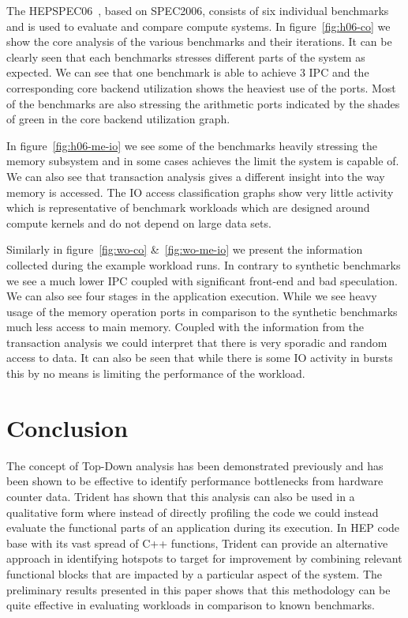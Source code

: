 \documentclass{webofc}
\begin{document}
The HEPSPEC06~\cite{michelotto2010comparison}, based on SPEC2006, consists of six individual benchmarks and is used to evaluate and compare compute systems. In figure~\ref{fig:h06-co} we show the core analysis of the various benchmarks and their iterations. It can be clearly seen that each benchmarks stresses different parts of the system as expected. We can see that one benchmark is able to achieve 3 IPC and the corresponding core backend utilization shows the heaviest use of the ports. Most of the benchmarks are also stressing the arithmetic ports indicated by the shades of green in the core backend utilization graph.

In figure~\ref{fig:h06-me-io} we see some of the benchmarks heavily stressing the memory subsystem and in some cases achieves the limit the system is capable of. We can also see that transaction analysis gives a different insight into the way memory is accessed. The IO access classification graphs show very little activity which is representative of benchmark workloads which are designed around compute kernels and do not depend on large data sets.

Similarly in figure~\ref{fig:wo-co} \&~\ref{fig:wo-me-io} we present the information collected during the example workload runs. In contrary to synthetic benchmarks we see a much lower IPC coupled with significant front-end and bad speculation. We can also see four stages in the application execution. While we see heavy usage of the memory operation ports in comparison to the synthetic benchmarks much less access to main memory. Coupled with the information from the transaction analysis we could interpret that there is very sporadic and random access to data. It can also be seen that while there is some IO activity in bursts this by no means is limiting the performance of the workload.


\section{Conclusion}

The concept of Top-Down analysis has been demonstrated previously and has been shown to be effective to identify performance bottlenecks from hardware counter data. Trident has shown that this analysis can also be used in a qualitative form where instead of directly profiling the code we could instead evaluate the functional parts of an application during its execution. In HEP code base with its vast spread of C++ functions, Trident can provide an alternative approach in identifying hotspots to target for improvement by combining relevant functional blocks that are impacted by a particular aspect of the system. The preliminary results presented in this paper shows that this methodology can be quite effective in evaluating workloads in comparison to known benchmarks.


\end{document}
